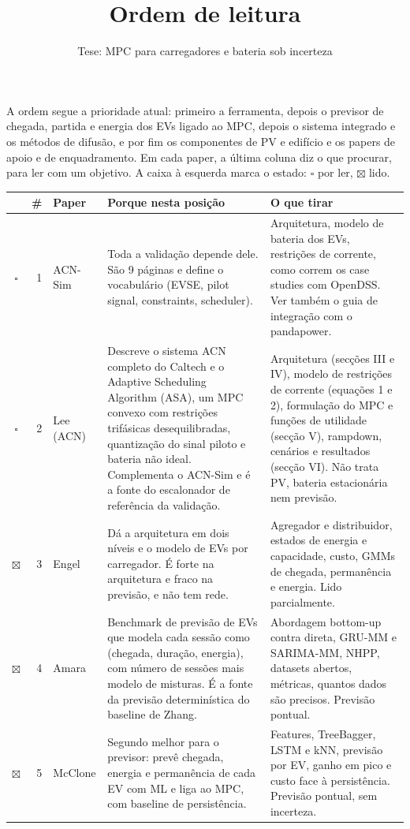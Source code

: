 \documentclass[11pt,a4paper]{article}
\title{Ordem de leitura}
\author{Tese: MPC para carregadores e bateria sob incerteza}
\date{}
\newcommand{\ckN}{$\square$}  %
\newcommand{\ckY}{$\boxtimes$} %
\begin{document}
\maketitle

A ordem segue a prioridade atual: primeiro a ferramenta, depois o previsor de chegada, partida e energia dos EVs ligado ao MPC, depois o sistema integrado e os métodos de difusão, e por fim os componentes de PV e edifício e os papers de apoio e de enquadramento.
Em cada paper, a última coluna diz o que procurar, para ler com um objetivo.
A caixa à esquerda marca o estado: $\square$ por ler, $\boxtimes$ lido.

\begin{center}
\small\renewcommand{\arraystretch}{1.3}
\begin{longtable}{@{}c r P{1.9cm} P{5.0cm} P{5.9cm}@{}}
\toprule
& \# & Paper & Porque nesta posição & O que tirar \\
\midrule
\endhead
\ckN & 1 & ACN-Sim & Toda a validação depende dele. São 9 páginas e define o vocabulário (EVSE, pilot signal, constraints, scheduler). & Arquitetura, modelo de bateria dos EVs, restrições de corrente, como correm os case studies com OpenDSS. Ver também o guia de integração com o pandapower. \\
\ckN & 2 & Lee (ACN) & Descreve o sistema ACN completo do Caltech e o Adaptive Scheduling Algorithm (ASA), um MPC convexo com restrições trifásicas desequilibradas, quantização do sinal piloto e bateria não ideal. Complementa o ACN-Sim e é a fonte do escalonador de referência da validação. & Arquitetura (secções III e IV), modelo de restrições de corrente (equações 1 e 2), formulação do MPC e funções de utilidade (secção V), rampdown, cenários e resultados (secção VI). Não trata PV, bateria estacionária nem previsão. \\
\ckY & 3 & Engel & Dá a arquitetura em dois níveis e o modelo de EVs por carregador. É forte na arquitetura e fraco na previsão, e não tem rede. & Agregador e distribuidor, estados de energia e capacidade, custo, GMMs de chegada, permanência e energia. Lido parcialmente. \\
\ckY & 4 & Amara & Benchmark de previsão de EVs que modela cada sessão como (chegada, duração, energia), com número de sessões mais modelo de misturas. É a fonte da previsão determinística do baseline de Zhang. & Abordagem bottom-up contra direta, GRU-MM e SARIMA-MM, NHPP, datasets abertos, métricas, quantos dados são precisos. Previsão pontual. \\
\ckY & 5 & McClone & Segundo melhor para o previsor: prevê chegada, energia e permanência de cada EV com ML e liga ao MPC, com baseline de persistência. & Features, TreeBagger, LSTM e kNN, previsão por EV, ganho em pico e custo face à persistência. Previsão pontual, sem incerteza. \\

\end{longtable}
\end{center}
\end{document}

